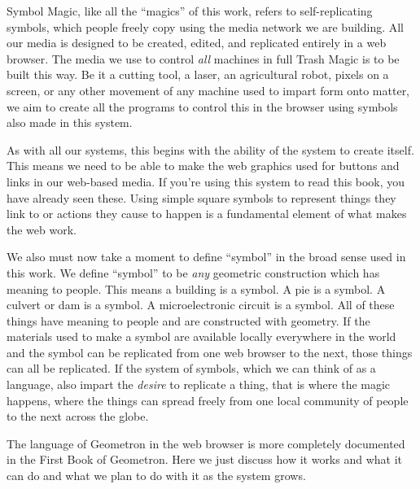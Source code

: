 
Symbol Magic, like all the ``magics'' of this work, refers to
self-replicating symbols, which people freely copy using the media
network we are building. All our media is designed to be created,
edited, and replicated entirely in a web browser. The media we use to
control \emph{all} machines in full Trash Magic is to be built this way.
Be it a cutting tool, a laser, an agricultural robot, pixels on a
screen, or any other movement of any machine used to impart form onto
matter, we aim to create all the programs to control this in the browser
using symbols also made in this system.

As with all our systems, this begins with the ability of the system to
create itself. This means we need to be able to make the web graphics
used for buttons and links in our web-based media. If you're using this
system to read this book, you have already seen these. Using simple
square symbols to represent things they link to or actions they cause to
happen is a fundamental element of what makes the web work.

We also must now take a moment to define ``symbol'' in the broad sense
used in this work. We define ``symbol'' to be \emph{any} geometric
construction which has meaning to people. This means a building is a
symbol. A pie is a symbol. A culvert or dam is a symbol. A
microelectronic circuit is a symbol. All of these things have meaning to
people and are constructed with geometry. If the materials used to make
a symbol are available locally everywhere in the world and the symbol
can be replicated from one web browser to the next, those things can all
be replicated. If the system of symbols, which we can think of as a
language, also impart the \emph{desire} to replicate a thing, that is
where the magic happens, where the things can spread freely from one
local community of people to the next across the globe.

The language of Geometron in the web browser is more completely
documented in the First Book of Geometron. Here we just discuss how it
works and what it can do and what we plan to do with it as the system
grows.

